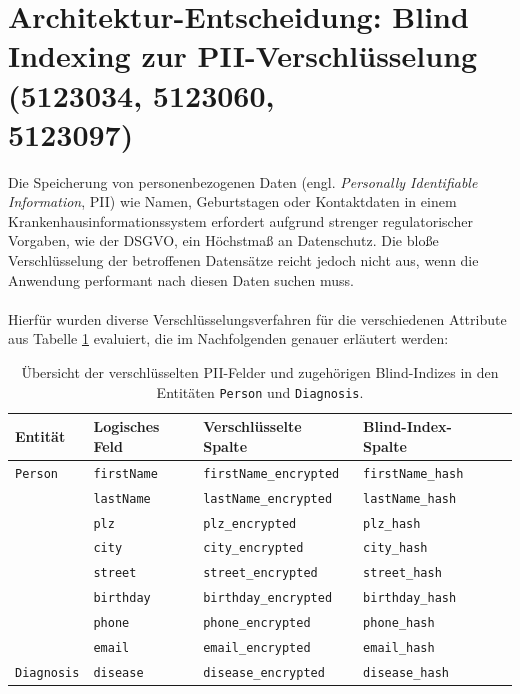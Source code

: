\section{Architektur-Entscheidung: Blind Indexing zur PII-Verschlüsselung (5123034, 5123060, \\5123097)}
Die Speicherung von personenbezogenen Daten (engl. \textit{Personally Identifiable Information}, PII) wie Namen, Geburtstagen oder Kontaktdaten in einem Krankenhausinformationssystem erfordert aufgrund strenger regulatorischer Vorgaben, wie der DSGVO, ein Höchstmaß an Datenschutz. 
Die bloße Verschlüsselung der betroffenen Datensätze reicht jedoch nicht aus, wenn die Anwendung performant nach diesen Daten suchen muss.
\\\\
Hierfür wurden diverse Verschlüsselungsverfahren für die verschiedenen Attribute aus Tabelle \ref{tab:pii_verschluesselung_uebersicht} evaluiert, die im Nachfolgenden genauer erläutert werden:

\begin{table}[htbp]
\centering
\begin{tabular}{lllll}
\toprule
\textbf{Entität} & \textbf{Logisches Feld} & \textbf{Verschlüsselte Spalte} & \textbf{Blind-Index-Spalte}   \\ \midrule
\texttt{Person}    & \texttt{firstName}      & \texttt{firstName\_encrypted}  & \texttt{firstName\_hash}   \\
                   & \texttt{lastName}       & \texttt{lastName\_encrypted}   & \texttt{lastName\_hash}   \\
                   & \texttt{plz}            & \texttt{plz\_encrypted}        & \texttt{plz\_hash}         \\
                   & \texttt{city}           & \texttt{city\_encrypted}       & \texttt{city\_hash}       \\
                   & \texttt{street}         & \texttt{street\_encrypted}     & \texttt{street\_hash}      \\
                   & \texttt{birthday}       & \texttt{birthday\_encrypted}   & \texttt{birthday\_hash}    \\
                   & \texttt{phone}          & \texttt{phone\_encrypted}      & \texttt{phone\_hash}       \\
                   & \texttt{email}          & \texttt{email\_encrypted}      & \texttt{email\_hash}    \\ \midrule
\texttt{Diagnosis} & \texttt{disease}        & \texttt{disease\_encrypted}    & \texttt{disease\_hash}     \\ \bottomrule
\end{tabular}
\caption{Übersicht der verschlüsselten PII-Felder und zugehörigen Blind-Indizes in den Entitäten \texttt{Person} und \texttt{Diagnosis}.}
\label{tab:pii_verschluesselung_uebersicht}
\end{table}

